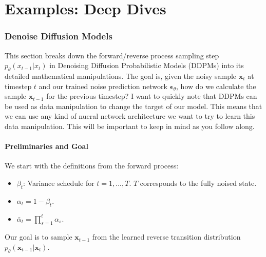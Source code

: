 \documentclass{article}
\newcommand{\bx}{\bm{x}}
\newcommand{\bepsilon}{\bm{\epsilon}}
\begin{document}
\newpage

\part{Examples: Deep Dives}

\section{Denoise Diffusion Models}

This section breaks down the forward/reverse process sampling step $p_\theta(x_{t-1} | x_t)$ in Denoising Diffusion Probabilistic Models (DDPMs) into its detailed mathematical manipulations. The goal is, given the noisy sample $\bx_t$ at timestep $t$ and our trained noise prediction network $\bepsilon_\theta$, how do we calculate the sample $\bx_{t-1}$ for the previous timestep? I want to quickly note that DDPMs can be used as data manipulation to change the target of our model. This means that we can use any kind of nueral network architecture we want to try to learn this data manipulation. This will be important to keep in mind as you follow along.

\subsection{Preliminaries and Goal}

We start with the definitions from the forward process:
\begin{itemize}
    \item $\beta_t$: Variance schedule for $t=1, ..., T$. $T$ corresponds to the fully noised state.
    \item $\alpha_t = 1 - \beta_t$.
    \item $\bar{\alpha}_t = \prod_{s=1}^t \alpha_s$.
\end{itemize}
Our goal is to sample $\bx_{t-1}$ from the learned reverse transition distribution $p_\theta(\bx_{t-1} | \bx_t)$.
\end{document}
